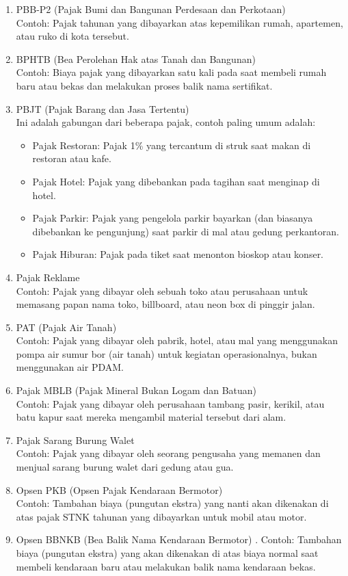\begin{enumerate}
    \item PBB-P2 (Pajak Bumi dan Bangunan Perdesaan dan Perkotaan)\\
    Contoh: Pajak tahunan yang dibayarkan atas kepemilikan rumah, apartemen, atau ruko di kota tersebut.
    \item BPHTB (Bea Perolehan Hak atas Tanah dan Bangunan)\\
    Contoh: Biaya pajak yang dibayarkan satu kali pada saat membeli rumah baru atau bekas dan melakukan proses balik nama sertifikat.
    \item PBJT (Pajak Barang dan Jasa Tertentu)\\
    Ini adalah gabungan dari beberapa pajak, contoh paling umum adalah:
    \begin{itemize}
        \item Pajak Restoran: Pajak 1\% yang tercantum di struk saat makan di restoran atau kafe.
        \item Pajak Hotel: Pajak yang dibebankan pada tagihan saat menginap di hotel.
        \item Pajak Parkir: Pajak yang pengelola parkir bayarkan (dan biasanya dibebankan ke pengunjung) saat parkir di mal atau gedung perkantoran.
        \item Pajak Hiburan: Pajak pada tiket saat menonton bioskop atau konser.
    \end{itemize}
    \item Pajak Reklame\\
    Contoh: Pajak yang dibayar oleh sebuah toko atau perusahaan untuk memasang papan nama toko, billboard, atau neon box di pinggir jalan.
    \item PAT (Pajak Air Tanah)\\
    Contoh: Pajak yang dibayar oleh pabrik, hotel, atau mal yang menggunakan pompa air sumur bor (air tanah) untuk kegiatan operasionalnya, bukan menggunakan air PDAM.
    \item Pajak MBLB (Pajak Mineral Bukan Logam dan Batuan)\\
    Contoh: Pajak yang dibayar oleh perusahaan tambang pasir, kerikil, atau batu kapur saat mereka mengambil material tersebut dari alam.
    \item Pajak Sarang Burung Walet\\
    Contoh: Pajak yang dibayar oleh seorang pengusaha yang memanen dan menjual sarang burung walet dari gedung atau gua.
    \item Opsen PKB (Opsen Pajak Kendaraan Bermotor)\\
    Contoh: Tambahan biaya (pungutan ekstra) yang nanti akan dikenakan di atas pajak STNK tahunan yang dibayarkan untuk mobil atau motor.
    \item Opsen BBNKB (Bea Balik Nama Kendaraan Bermotor) \cite{uu1_2022}.
    Contoh: Tambahan biaya (pungutan ekstra) yang akan dikenakan di atas biaya normal saat membeli kendaraan baru atau melakukan balik nama kendaraan bekas.
\end{enumerate}